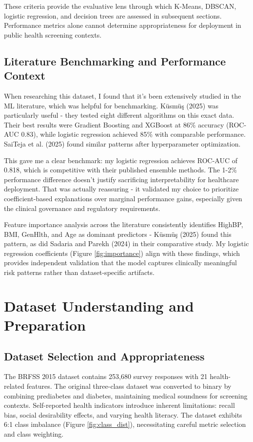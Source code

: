 \documentclass[12pt,a4paper]{article}
\begin{document}
These criteria provide the evaluative lens through which K-Means, DBSCAN, logistic regression, and decision trees are assessed in subsequent sections. Performance metrics alone cannot determine appropriateness for deployment in public health screening contexts.

\subsection{Literature Benchmarking and Performance Context}

When researching this dataset, I found that it's been extensively studied in the ML literature, which was helpful for benchmarking. Küsmüş (2025) was particularly useful - they tested eight different algorithms on this exact data. Their best results were Gradient Boosting and XGBoost at 86\% accuracy (ROC-AUC 0.83), while logistic regression achieved 85\% with comparable performance. SaiTeja et al. (2025) found similar patterns after hyperparameter optimization.

This gave me a clear benchmark: my logistic regression achieves ROC-AUC of 0.818, which is competitive with their published ensemble methods. The 1-2\% performance difference doesn't justify sacrificing interpretability for healthcare deployment. That was actually reassuring - it validated my choice to prioritize coefficient-based explanations over marginal performance gains, especially given the clinical governance and regulatory requirements.

Feature importance analysis across the literature consistently identifies HighBP, BMI, GenHlth, and Age as dominant predictors - Küsmüş (2025) found this pattern, as did Sadaria and Parekh (2024) in their comparative study. My logistic regression coefficients (Figure \ref{fig:importance}) align with these findings, which provides independent validation that the model captures clinically meaningful risk patterns rather than dataset-specific artifacts.

\section{Dataset Understanding and Preparation}

\subsection{Dataset Selection and Appropriateness}

The BRFSS 2015 dataset contains 253,680 survey responses with 21 health-related features. The original three-class dataset was converted to binary by combining prediabetes and diabetes, maintaining medical soundness for screening contexts. Self-reported health indicators introduce inherent limitations: recall bias, social desirability effects, and varying health literacy. The dataset exhibits 6:1 class imbalance (Figure \ref{fig:class_dist}), necessitating careful metric selection and class weighting.
\end{document}
